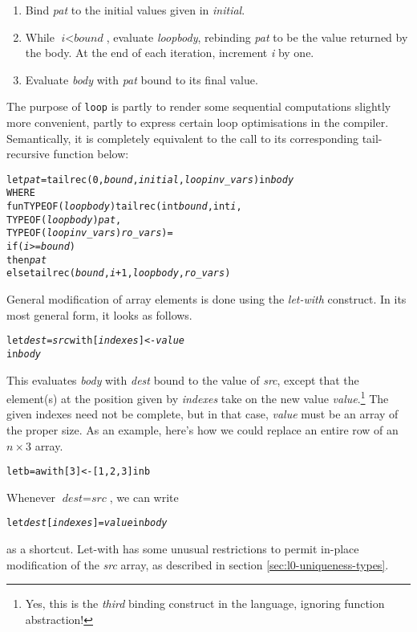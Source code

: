 \documentclass[oneside]{memoir}
\begin{document}
\begin{enumerate}
  \item Bind \textit{pat} to the initial values given in \textit{initial}.
  \item While $\textit{i} < \textit{bound}$, evaluate
    \textit{loopbody}, rebinding \textit{pat} to be the value returned
    by the body.  At the end of each iteration, increment \textit{i}
    by one.
  \item Evaluate \textit{body} with \textit{pat} bound to its final
    value.
\end{enumerate}
The purpose of \texttt{loop} is partly to render some sequential
computations slightly more convenient, partly to express certain loop
optimisations in the compiler.  Semantically, it is completely
equivalent to the call to its corresponding tail-recursive 
function below:
\begin{alltt}
    let {\em pat} = tailrec(0, \emph{bound}, \emph{initial}, \emph{loopinv\_vars}) in \emph{body}
  WHERE
    fun TYPEOF(\emph{loopbody}) tailrec (int \emph{bound}, int {\em i}, 
                                  TYPEOF(\emph{loopbody}) \emph{pat}, 
                                  TYPEOF(\emph{loopinv_vars}) \emph{ro\_vars}) =
        if (\emph{i} >= \emph{bound}) 
        then \emph{pat}
        else tailrec(\emph{bound}, {\em i}+1, \emph{loopbody}, \emph{ro\_vars})
\end{alltt}

General modification of array elements is done using the
\emph{let-with} construct.  In its most general form, it looks as
follows.
\begin{alltt}
  let \textit{dest} = \textit{src} with [\textit{indexes}] <- \textit{value}
  in \textit{body}
\end{alltt}
This evaluates \textit{body} with \textit{dest} bound to the value of
\textit{src}, except that the element(s) at the position given by
\textit{indexes} take on the new value \textit{value}.\footnote{Yes,
  this is the \emph{third} binding construct in the language, ignoring
  function abstraction!}  The given indexes need not be complete, but
in that case, \textit{value} must be an array of the proper size.  As
an example, here's how we could replace an entire row of an
$n\times3$ array.
\begin{alltt}
  let b = a with [3] <- [1,2,3] in b
\end{alltt}
Whenever $\textit{dest} = \textit{src}$, we can write
\begin{alltt}
  let \textit{dest}[\textit{indexes}] = \textit{value} in \textit{body}
\end{alltt}
as a shortcut.  Let-with has some unusual restrictions to permit
in-place modification of the \textit{src} array, as described in
section \ref{sec:l0-uniqueness-types}.
\end{document}
